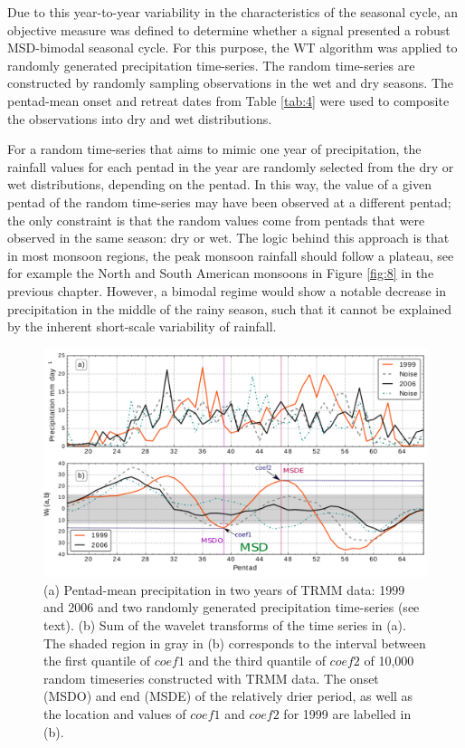 Due to this year-to-year variability in the characteristics of the seasonal cycle, an objective measure was defined to determine whether a signal presented a robust MSD-bimodal seasonal cycle.  
For this purpose, the WT algorithm was applied to randomly generated precipitation time-series.
 The random time-series are constructed by randomly sampling observations in the wet and dry seasons. 
 The pentad-mean onset and retreat dates from Table \ref{tab:4} were used to composite the observations into dry and wet distributions. 
 
 
 For a random time-series that aims to mimic one year of precipitation, the rainfall values for each pentad in the year are randomly selected from the dry or wet distributions, depending on the pentad. In this way, the value of a given pentad of the random time-series may have been observed at a different pentad; the only constraint is that the random values come from pentads that were observed in the same season: dry or wet. The logic behind this approach is that in most monsoon regions, the peak monsoon rainfall should follow a plateau, see for example the North and South American monsoons in Figure \ref{fig:8} in the previous chapter. However, a bimodal regime would show a notable decrease in precipitation in the middle of the rainy season, such that it cannot be explained by the inherent short-scale variability of rainfall. 
 
\begin{figure}[t!]
\centering
\includegraphics[width=\linewidth]{figures/wav_S1.pdf}
\caption[Determination of MSD timings and coefficients]{(a) Pentad-mean precipitation in two years of TRMM data: 1999 and 2006 and two randomly generated precipitation time-series (see text). (b) Sum of the wavelet transforms of the time series in (a). The shaded region in gray in (b) corresponds to the interval between the first quantile of $coef1$ and the third quantile of $coef2$ of 10,000 random timeseries constructed with TRMM data. The onset (MSDO) and end (MSDE) of the relatively drier period, as well as the location and values of $coef1$ and $coef2$ for 1999 are labelled in (b). }
\label{fig:S1}
\end{figure}
 
